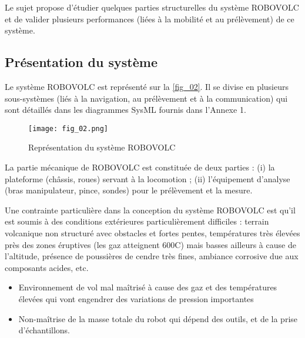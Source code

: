 \begin{obj}
Le sujet propose d'étudier quelques parties structurelles du système ROBOVOLC et de
valider plusieurs performances (liées à la mobilité et au prélèvement) de ce système. 
\end{obj}

\subsection{Présentation du système}

\ifprof
\else
Le système ROBOVOLC est représenté sur la \autoref{fig_02}. Il se divise en plusieurs sous-systèmes
(liés à la navigation, au prélèvement et à la communication) qui sont détaillés dans les
diagrammes SysML fournis dans l'Annexe 1. 

\begin{figure}[H]
\centering
\texttt{[image: fig\_02.png]}
\caption{Représentation du système ROBOVOLC \label{fig_02}}
\end{figure}

La partie mécanique de ROBOVOLC est constituée de deux parties : (i) la plateforme (châssis,
roues) servant à la locomotion ; (ii) l'équipement d'analyse (bras manipulateur, pince, sondes) pour
le prélèvement et la mesure.

Une contrainte particulière dans la conception du système ROBOVOLC est qu'il est soumis à des
conditions extérieures particulièrement difficiles : terrain volcanique non structuré avec obstacles et
fortes pentes, températures très élevées près des zones éruptives (les gaz atteignent 600\degres C) mais
basses ailleurs à cause de l'altitude, présence de poussières de cendre très fines, ambiance
corrosive due aux composants acides, etc.

\fi
\ifprof
\begin{corrige}
\begin{itemize}
\item Environnement de vol mal maîtrisé à cause des gaz et des températures élevées qui vont engendrer des variations de pression importantes
\item Non-maîtrise de la masse totale du robot qui dépend des outils, et de la prise d’échantillons. 
\end{itemize}
\end{corrige}
\else
\fi

